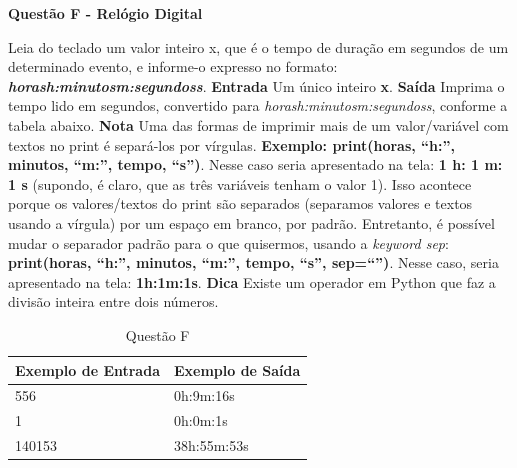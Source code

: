 \documentclass[a4paper, 12pt]{article}
\begin{document}
\newpage %
\begin{center}
\textbf{{\Large Questão F - Relógio Digital}}
\end{center}
\vspace{5pt}
Leia do teclado um valor inteiro x, que é o tempo de duração em segundos de um determinado evento, e informe-o expresso no formato: \textbf{\textit{horash:minutosm:segundoss}}.
\newline \newline
\textbf{{\large Entrada}} \newline
Um único inteiro \textbf{x}.
\newline \newline
\textbf{{\large Saída}} \newline
Imprima o tempo lido em segundos, convertido para \textit{horash:minutosm:segundoss}, conforme 
a tabela abaixo.
\newline \newline
\textbf{{\large Nota}} \newline
Uma das formas de imprimir mais de um valor/variável com textos no print é separá-los por vírgulas. \newline
\textbf{Exemplo: print(horas, “h:”, minutos, “m:”, tempo, “s”)}. Nesse caso seria apresentado na tela: 
\textbf{1 h: 1 m: 1 s} (supondo, é claro, que as três variáveis tenham o valor 1). Isso acontece porque os valores/textos do print são separados (separamos valores e textos usando a vírgula) por um espaço em branco, por padrão. Entretanto, é possível mudar o separador padrão para o que quisermos, usando a \textit{keyword sep}: \newline
\textbf{print(horas, ``h:'', minutos, ``m:'', tempo, ``s'', sep=``'')}. Nesse caso, seria apresentado na tela: \textbf{1h:1m:1s}.
\newline \newline
\textbf{{\large Dica}} \newline
Existe um operador em Python que faz a divisão inteira entre dois números.
\newline
\begin{table}[H]
	\centering
	\begin{tabular}{|l|l|}
	\hline
	\textbf{Exemplo de Entrada} & \textbf{Exemplo de Saída} \\ \hline
	556 & 0h:9m:16s \\ \hline
	1 & 0h:0m:1s \\ \hline
	140153 & 38h:55m:53s \\ \hline
	\end{tabular}
	\caption{Questão F}
	\label{tabela6}
\end{table}
\end{document}
